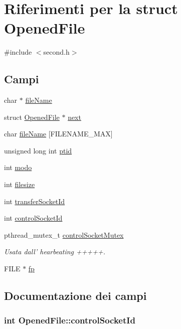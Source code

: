 \hypertarget{structOpenedFile}{\section{Riferimenti per la struct Opened\+File}
\label{structOpenedFile}
}


{\ttfamily \#include $<$second.\+h$>$}

\subsection*{Campi}
\begin{DoxyCompactItemize}
\item 
char $\ast$ \hyperlink{structOpenedFile_aedf1760d8d86e2f3efbb12cc7f4ce13e}{file\+Name}
\item 
struct \hyperlink{structOpenedFile}{Opened\+File} $\ast$ \hyperlink{structOpenedFile_a9b8c8b995cdda6da249a6ce9a9df98b2}{next}
\item 
char \hyperlink{structOpenedFile_a060ea540c44e9570b59a0e2297e9d47b}{file\+Name} \mbox{[}F\+I\+L\+E\+N\+A\+M\+E\+\_\+\+M\+A\+X\mbox{]}
\item 
unsigned long int \hyperlink{structOpenedFile_a33cb5376fd14129a1635cf142c0781a6}{ptid}
\item 
int \hyperlink{structOpenedFile_a6d9f22ff6ba81506ba9c4a60f27c4f32}{modo}
\item 
int \hyperlink{structOpenedFile_a3b2e157f5aad06b65bd017d67fde4eb3}{filesize}
\item 
int \hyperlink{structOpenedFile_a2b10a150aba89a8d193cd251012682a7}{transfer\+Socket\+Id}
\item 
int \hyperlink{structOpenedFile_a591b34fa52d94c831734d7cead0c6630}{control\+Socket\+Id}
\item 
pthread\+\_\+mutex\+\_\+t \hyperlink{structOpenedFile_a59d8fd7142cc9f6a40828160a0f5fc08}{control\+Socket\+Mutex}
\begin{DoxyCompactList}\small\item\em Usata dall' hearbeating +++++. \end{DoxyCompactList}\item 
F\+I\+L\+E $\ast$ \hyperlink{structOpenedFile_a9cdcaccacb2eb66a17c0781666c28b15}{fp}
\end{DoxyCompactItemize}


\subsection{Documentazione dei campi}
\hypertarget{structOpenedFile_a591b34fa52d94c831734d7cead0c6630}{
\subsubsection[{control\+Socket\+Id}]{\setlength{\rightskip}{0pt plus 5cm}int Opened\+File\+::control\+Socket\+Id}}\label{structOpenedFile_a591b34fa52d94c831734d7cead0c6630}


